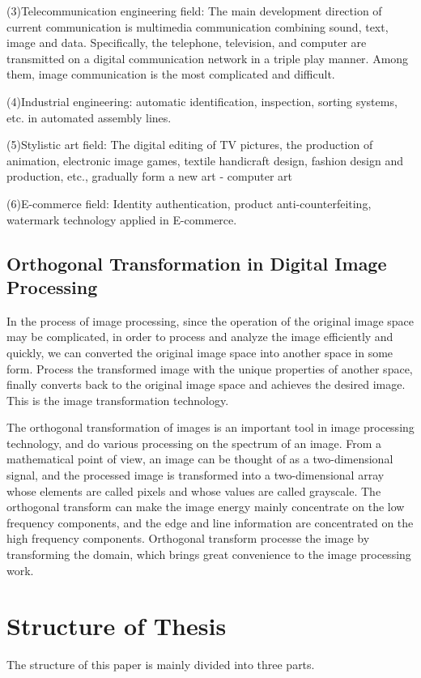 (3)Telecommunication engineering field: The main development direction of current communication is multimedia communication combining sound, text, image and data. Specifically, the telephone, television, and computer are transmitted on a digital communication network in a triple play manner. Among them, image communication is the most complicated and difficult.

(4)Industrial engineering: automatic identification, inspection, sorting systems, etc. in automated assembly lines.

(5)Stylistic art field: The digital editing of TV pictures, the production of animation, electronic image games, textile handicraft design, fashion design and production, etc., gradually form a new art - computer art

(6)E-commerce field: Identity authentication, product anti-counterfeiting, watermark technology applied in E-commerce.
\subsection{Orthogonal Transformation in Digital Image Processing}
In the process of image processing, since the operation of the original image space may be complicated, in order to process and analyze the image efficiently and quickly, we can converted the original image space into another space in some form. Process the transformed image with the unique properties of another space, finally converts back to the original image space and achieves the desired image. This is the image transformation technology\cite{ref3}.

The orthogonal transformation of images is an important tool in image processing technology, and do various processing on the spectrum of an image. From a mathematical point of view, an image can be thought of as a two-dimensional signal, and the processed image is transformed into a two-dimensional array whose elements are called pixels and whose values are called grayscale. The orthogonal transform can make the image energy mainly concentrate on the low frequency components, and the edge and line information are concentrated on the high frequency components. Orthogonal transform processe the image by transforming the domain, which brings great convenience to the image processing work.
\section{Structure of Thesis}
The structure of this paper is mainly divided into three parts.

